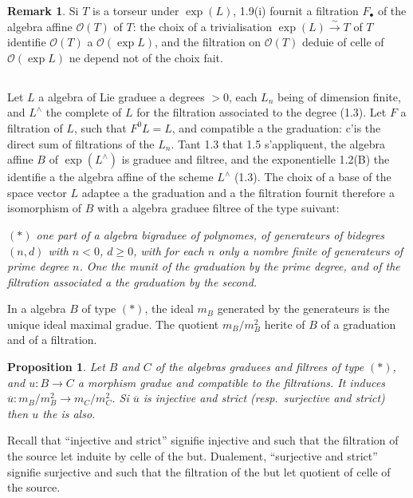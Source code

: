 \documentclass[11pt,a4paper]{article}
\theoremstyle{plain}
\newtheorem{proposition}[theorem]{Proposition}
\theoremstyle{definition}
\newtheorem{remark}[theorem]{Remark}
\begin{document}
\begin{remark}
\label{rmk:1.10}
Si $T$ is a torseur under $\exp(L)$, 1.9(i) fournit a filtration $F_{\bullet}$ of the algebra affine $\mathcal{O}(T)$ of $T$: the choix of a trivialisation $\exp(L) \xrightarrow{\sim} T$ of $T$ identifie $\mathcal{O}(T)$ a $\mathcal{O}(\exp L)$, and the filtration on $\mathcal{O}(T)$ deduie of celle of $\mathcal{O}(\exp L)$ ne depend not of the choix fait.
\end{remark}

\subsection{}
Let $L$ a algebra of Lie graduee a degrees $> 0$, each $L_n$ being of dimension finite, and $L^{\wedge}$ the complete of $L$ for the filtration associated to the degree (1.3). Let $F$ a filtration of $L$, such that $F^0L = L$, and compatible a the graduation: c'is the direct sum of filtrations of the $L_n$. Tant 1.3 that 1.5 s'appliquent, the algebra affine $B$ of $\exp(L^{\wedge})$ is graduee and filtree, and the exponentielle 1.2(B) the identifie a the algebra affine of the scheme $L^{\wedge}$ (1.3). The choix of a base of the space vector $L$ adaptee a the graduation and a the filtration fournit therefore a isomorphism of $B$ with a algebra graduee filtree of the type suivant:

\emph{$(\ast)$ one part of a algebra bigraduee of polynomes, of generateurs of bidegres $(n,d)$ with $n < 0$, $d \geq 0$, with for each $n$ only a nombre finite of generateurs of prime degree $n$. One the munit of the graduation by the prime degree, and of the filtration associated a the graduation by the second.}

In a algebra $B$ of type $(\ast)$, the ideal $m_B$ generated by the generateurs is the unique ideal maximal gradue. The quotient $m_B/m_B^2$ herite of $B$ of a graduation and of a filtration.

\begin{proposition}
\label{prop:1.12}
Let $B$ and $C$ of the algebras graduees and filtrees of type $(\ast)$, and $u: B \to C$ a morphism gradue and compatible to the filtrations. It induces $\overline{u}: m_B/m_B^2 \to m_C/m_C^2$. Si $\overline{u}$ is injective and strict (resp.~surjective and strict) then $u$ the is also.
\end{proposition}

Recall that ``injective and strict'' signifie injective and such that the filtration of the source let induite by celle of the but. Dualement, ``surjective and strict'' signifie surjective and such that the filtration of the but let quotient of celle of the source.
\end{document}
